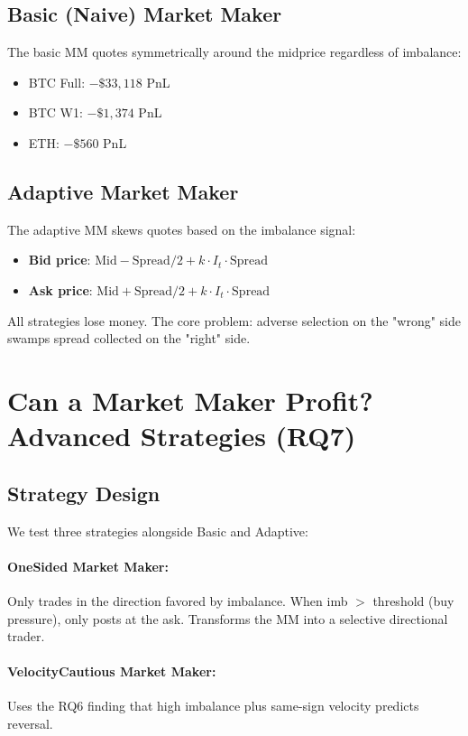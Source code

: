 \documentclass[12pt,a4paper]{article}
\begin{document}
\subsection{Basic (Naive) Market Maker}

The basic MM quotes symmetrically around the midprice regardless of imbalance:
\begin{itemize}
    \item BTC Full: $-\$33,118$ PnL
    \item BTC W1: $-\$1,374$ PnL
    \item ETH: $-\$560$ PnL
\end{itemize}

\subsection{Adaptive Market Maker}

The adaptive MM skews quotes based on the imbalance signal:
\begin{itemize}
    \item \textbf{Bid price}: $\text{Mid} - \text{Spread}/2 + k \cdot I_t \cdot \text{Spread}$
    \item \textbf{Ask price}: $\text{Mid} + \text{Spread}/2 + k \cdot I_t \cdot \text{Spread}$
\end{itemize}

All strategies lose money. The core problem: adverse selection on the "wrong" side swamps spread collected on the "right" side.

\section{Can a Market Maker Profit? Advanced Strategies (RQ7)}

\subsection{Strategy Design}

We test three strategies alongside Basic and Adaptive:

\paragraph{OneSided Market Maker:} Only trades in the direction favored by imbalance. When imb $>$ threshold (buy pressure), only posts at the ask. Transforms the MM into a selective directional trader.

\paragraph{VelocityCautious Market Maker:} Uses the RQ6 finding that high imbalance plus same-sign velocity predicts reversal.
\end{document}
